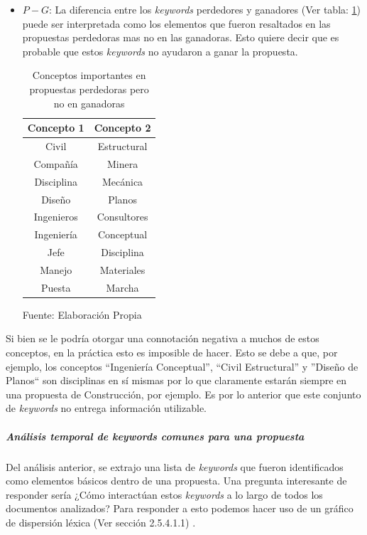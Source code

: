 \begin{itemize}
        \item $P - G$: La diferencia entre los \textit{keywords} perdedores y ganadores (Ver tabla: \ref{table:Conceptos_sin_valor}) puede ser interpretada como los elementos que fueron resaltados en las propuestas perdedoras mas no en las ganadoras. Esto quiere decir que es probable que estos \textit{keywords} no ayudaron a ganar la propuesta.
        
        \begin{table}[H]
        \centering
        \begin{tabular}{|c|c|}
        \hline
        \textbf{Concepto 1} & \textbf{Concepto 2} \\ \hline
        Civil               & Estructural         \\ \hline
        Compañía            & Minera              \\ \hline
        Disciplina          & Mecánica            \\ \hline
        Diseño              & Planos              \\ \hline
        Ingenieros          & Consultores         \\ \hline
        Ingeniería          & Conceptual          \\ \hline
        Jefe                & Disciplina          \\ \hline
        Manejo              & Materiales          \\ \hline
        Puesta              & Marcha              \\ \hline
        \end{tabular}
        \caption{\label{table:Conceptos_sin_valor} Conceptos importantes en propuestas perdedoras pero no en ganadoras} Fuente: Elaboración Propia
        \end{table}
    \end{itemize}
    Si bien se le podría otorgar una connotación negativa a muchos de estos conceptos, en la práctica esto es imposible de hacer. Esto se debe a que, por ejemplo, los conceptos ``Ingeniería Conceptual'', ``Civil Estructural'' y ''Diseño de Planos`` son disciplinas en sí mismas por lo que claramente estarán siempre en una propuesta de Construcción, por ejemplo. Es por lo anterior que este conjunto de \textit{keywords} no entrega información utilizable.
\subparagraph{Análisis temporal de keywords comunes para una propuesta} 
\subparagraph*{}
    Del análisis anterior, se extrajo una lista de \textit{keywords} que fueron identificados como elementos básicos dentro de una propuesta. Una pregunta interesante de responder sería ¿Cómo interactúan estos \textit{keywords} a lo largo de todos los documentos analizados? Para responder a esto podemos hacer uso de un gráfico de dispersión léxica (Ver sección 2.5.4.1.1) .
    
